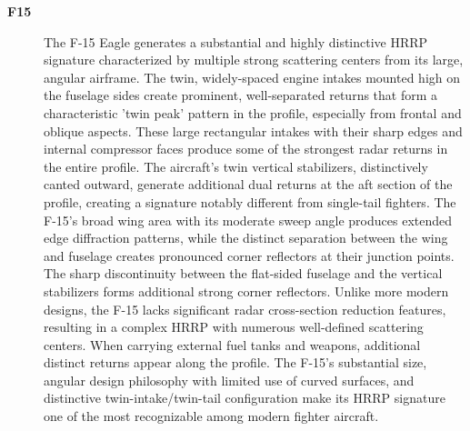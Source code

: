 {\begin{description}
    \item[\textbf{F15}]
    The F-15 Eagle generates a substantial and highly distinctive HRRP signature characterized by multiple strong scattering centers from its large, angular airframe. The twin, widely-spaced engine intakes mounted high on the fuselage sides create prominent, well-separated returns that form a characteristic 'twin peak' pattern in the profile, especially from frontal and oblique aspects. These large rectangular intakes with their sharp edges and internal compressor faces produce some of the strongest radar returns in the entire profile. The aircraft's twin vertical stabilizers, distinctively canted outward, generate additional dual returns at the aft section of the profile, creating a signature notably different from single-tail fighters. The F-15's broad wing area with its moderate sweep angle produces extended edge diffraction patterns, while the distinct separation between the wing and fuselage creates pronounced corner reflectors at their junction points. The sharp discontinuity between the flat-sided fuselage and the vertical stabilizers forms additional strong corner reflectors. Unlike more modern designs, the F-15 lacks significant radar cross-section reduction features, resulting in a complex HRRP with numerous well-defined scattering centers. When carrying external fuel tanks and weapons, additional distinct returns appear along the profile. The F-15's substantial size, angular design philosophy with limited use of curved surfaces, and distinctive twin-intake/twin-tail configuration make its HRRP signature one of the most recognizable among modern fighter aircraft.


\end{description}}
